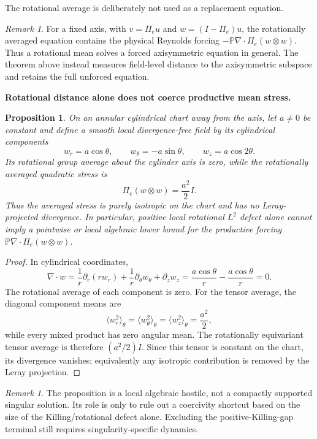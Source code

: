 \documentclass[11pt]{article}
\newtheorem{proposition}[theorem]{Proposition}
\theoremstyle{definition}\newtheorem{problem}[theorem]{Problem}
\theoremstyle{definition}
\theoremstyle{remark}
\newtheorem{remark}[theorem]{Remark}
\begin{document}
The rotational average is deliberately not used as a replacement equation.
\begin{remark}
For a fixed axis, with $v=\Pi_eu$ and $w=(I-\Pi_e)u$, the rotationally
averaged equation contains the physical Reynolds forcing
$-\mathbb P\nabla\cdot\Pi_e(w\otimes w)$.  Thus a rotational mean solves a
forced axisymmetric equation in general.  The theorem above instead measures
field-level distance to the axisymmetric subspace and retains the full
unforced equation.
\end{remark}


\medskip
\noindent\textbf{Rotational distance alone does not coerce productive mean stress.}
\begin{proposition}\label{prop:rot-stress-hostile}
On an annular cylindrical chart away from the axis, let \(a\ne0\) be constant
and define a smooth local divergence-free field by its cylindrical components
\[
 w_r=a\cos\theta,\qquad
 w_\theta=-a\sin\theta,\qquad
 w_z=a\cos2\theta.
\]
Its rotational group average about the cylinder axis is zero, while the
rotationally averaged quadratic stress is
\[
 \boxed{\Pi_e(w\otimes w)=\frac{a^2}{2}I.}
\]
Thus the averaged stress is purely isotropic on the chart and has no
Leray-projected divergence.  In particular, positive local rotational
\(L^2\) defect alone cannot imply a pointwise or local algebraic lower bound
for the productive forcing
\(\mathbb P\nabla\cdot\Pi_e(w\otimes w)\).
\end{proposition}

\begin{proof}
In cylindrical coordinates,
\[
 \nabla\cdot w
 =
 \frac1r\partial_r(rw_r)
 +\frac1r\partial_\theta w_\theta
 +\partial_zw_z
 =
 \frac{a\cos\theta}{r}
 -\frac{a\cos\theta}{r}
 =0.
\]
The rotational average of each component is zero.  For the tensor average, the
diagonal component means are
\[
 \langle w_r^2\rangle_\theta
 =
 \langle w_\theta^2\rangle_\theta
 =
 \langle w_z^2\rangle_\theta
 =\frac{a^2}{2},
\]
while every mixed product has zero angular mean.  The rotationally equivariant
tensor average is therefore \((a^2/2)I\).  Since this tensor is constant on
the chart, its divergence vanishes; equivalently any isotropic contribution
is removed by the Leray projection.
\end{proof}

\begin{remark}
The proposition is a local algebraic hostile, not a compactly supported
singular solution.  Its role is only to rule out a coercivity shortcut based
on the size of the Killing/rotational defect alone.  Excluding the
positive-Killing-gap terminal still requires singularity-specific dynamics.
\end{remark}
\end{document}
